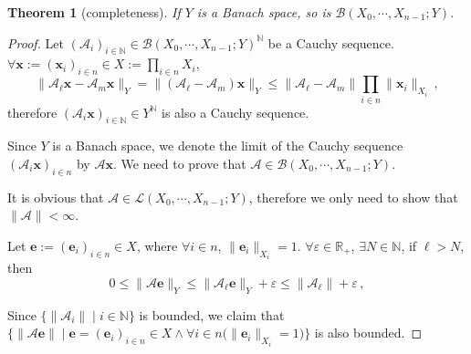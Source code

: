 \documentclass[openany]{book}
\theoremstyle{plain}
\newtheorem{theorem}{Theorem}[section] %
\theoremstyle{definition}
\newcommand*{\bv}{\boldsymbol} %
\begin{document}
\begin{theorem}[completeness]
	\label{theorem: Y is complete so is the space of linear operators onto it}
	If $Y$ is a Banach space, so is $\mathcal B(X_0, \cdots, X_{n-1}; Y)$.
\end{theorem}
\begin{proof}
	Let $(\mathscr A_i)_{i \in \mathbb N} \in \mathcal B(X_0, \cdots, X_{n-1}; Y)^{\mathbb N}$ be a Cauchy sequence. 
	$\forall \bv x := (\bv x_i)_{i \in n} \in X := \prod_{i \in n} X_i$, 
	\begin{equation*}
		\|\mathscr A_\ell \bv x - \mathscr A_m \bv x\|_Y
		= \|(\mathscr A_\ell - \mathscr A_m) \bv x\|_Y
		\leq \|\mathscr A_\ell - \mathscr A_m\| \prod_{i \in n} \|\bv x_i\|_{X_i}
		\,,
	\end{equation*}
	therefore $(\mathscr A_i \bv x)_{i \in \mathbb N} \in Y^\mathbb N$ is also a Cauchy sequence.

	Since $Y$ is a Banach space, we denote the limit of the Cauchy sequence $(\mathscr A_i \bv x)_{i \in n}$ by $\mathscr A \bv x$. 
	We need to prove that $\mathscr A \in \mathcal B(X_0, \cdots, X_{n-1}; Y)$.

	It is obvious that $\mathscr A \in \mathcal L(X_0, \cdots, X_{n-1}; Y)$, therefore we only need to show that $\|\mathscr A\| < \infty$.

	Let $\bv e := (\bv e_i)_{i \in n} \in X$, where $\forall i \in n$, $\|\bv e_i\|_{X_i} = 1$. 
	$\forall \varepsilon \in \mathbb R_+$, $\exists N \in \mathbb N$, if $\ell > N$, then
	\begin{equation*}
		0 \leq \|\mathscr A \bv e\|_Y
			\leq \|\mathscr A_\ell \bv e\|_Y + \varepsilon
			\leq \|\mathscr A_\ell\| + \varepsilon\,, 
	\end{equation*} 

	Since $\{\|\mathscr A_i\| \mid i \in \mathbb N\}$ is bounded, we claim that $\big\{\|\mathscr A \bv e\| \mid \bv e = (\bv e_i)_{i \in n} \in X \wedge \forall i \in n \big( \|\bv e_i\|_{X_i} = 1\big)\big\}$ is also bounded.
\end{proof}
\end{document}
